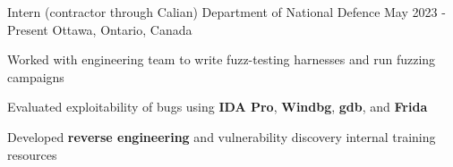 

\begin{cventries}

  \cventry
    {Intern (contractor through Calian)} %
    {Department of National Defence} %
    {May 2023 - Present} %
    {Ottawa, Ontario, Canada} %
    {
      \begin{cvitems} %
        \item{Worked with engineering team to write fuzz-testing harnesses and run fuzzing campaigns}
        \item{Evaluated exploitability of bugs using \textbf{IDA Pro}, \textbf{Windbg}, \textbf{gdb}, and \textbf{Frida}}
        \item{Developed \textbf{reverse engineering} and vulnerability discovery internal training resources}
      \end{cvitems}
    }


\end{cventries}
